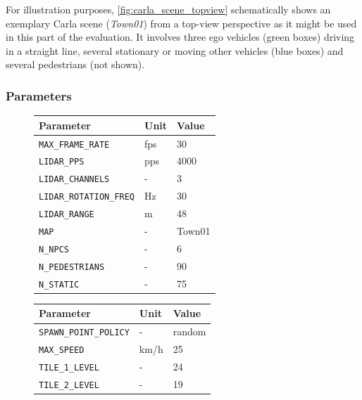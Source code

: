 For illustration purposes, \cref{fig:carla_scene_topview} schematically shows an exemplary Carla scene (\textit{Town01}) from a top-view perspective as it might be used in this part of the evaluation. It involves three ego vehicles (green boxes) driving in a straight line, several stationary or moving other vehicles (blue boxes) and several pedestrians (not shown).
\par
\bigskip

\subsubsection{Parameters}

\begin{figure}
	\begin{minipage}{0.5\textwidth}
		\begin{tabular}{|p{4.1cm}|p{1.1cm}|p{1.4cm}|}
			\hline 
			\textbf{Parameter} & \textbf{Unit} & \textbf{Value} \\ 
			\hline 
			\texttt{MAX\_FRAME\_RATE} & fps & 30 \\ 
			\hline 
			\texttt{LIDAR\_PPS} & pps & 4000 \\ 
			\hline 
			\texttt{LIDAR\_CHANNELS} & - & 3 \\ 
			\hline 
			\texttt{LIDAR\_ROTATION\_FREQ} & Hz & 30 \\ 
			\hline 
			\texttt{LIDAR\_RANGE} & m & 48 \\ 
			\hline 
			\texttt{MAP} & - & Town01 \\ 
			\hline 
			\texttt{N\_NPCS} & - & 6 \\ 
			\hline 
			\texttt{N\_PEDESTRIANS} & - & 90 \\ 
			\hline 
			\texttt{N\_STATIC} & - & 75 \\ 
			\hline 
		\end{tabular}
	\end{minipage}
	\begin{minipage}{0.5\textwidth}
		\begin{tabular}{|p{4.1cm}|p{1.1cm}|p{1.4cm}|}
			\hline 
			\textbf{Parameter} & \textbf{Unit} & \textbf{Value} \\ 
			\hline 
			\texttt{SPAWN\_POINT\_POLICY} & - & random \\ 
			\hline 
			\texttt{MAX\_SPEED} & km/h & 25 \\ 
			\hline 
			\texttt{TILE\_1\_LEVEL} & - & 24 \\ 
			\hline 
			\texttt{TILE\_2\_LEVEL} & - & 19 \\ 
			\hline 

\end{tabular}
\end{minipage}
\end{figure}
